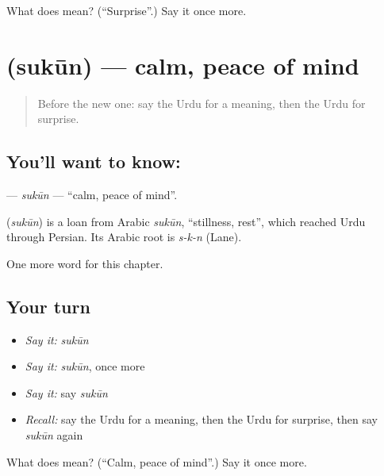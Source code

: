\begin{tcolorbox}[breakable,colback=teal!4,colframe=teal!35!black,title={Before you move on}]
What does  mean? (\textquotedblleft{}Surprise\textquotedblright{}.) Say it once more.
\end{tcolorbox}
\section[\texorpdfstring{\ur{سکون} (sukūn)}{سکون (sukūn)}]{ (sukūn) — calm, peace of mind}

\label{lesson:UR-C172-sukun}



\begin{quote}
Before the new one: say the Urdu for a meaning, then the Urdu for surprise.
\end{quote}

\subsection*{You'll want to know: }
\textbf{} — \emph{sukūn} — \textquotedblleft{}calm, peace of mind\textquotedblright{}.

\begin{cousinweb}
\textbf{} (\emph{sukūn}) is a loan from Arabic \emph{sukūn}, \textquotedblleft{}stillness, rest\textquotedblright{}, which reached Urdu through Persian. Its Arabic root is \emph{s-k-n} (Lane).
\end{cousinweb}

\begin{grammarlens}[title={What you've built}]
One more word for this chapter.
\end{grammarlens}

\subsection*{Your turn}
\begin{itemize}
\raggedright
  \item \emph{Say it:} \emph{sukūn}
  \item \emph{Say it:} \emph{sukūn}, once more
  \item \emph{Say it:} say \emph{sukūn}
  \item \emph{Recall:} say the Urdu for a meaning, then the Urdu for surprise, then say \emph{sukūn} again
\end{itemize}

\begin{tcolorbox}[breakable,colback=teal!4,colframe=teal!35!black,title={Before you move on}]
What does  mean? (\textquotedblleft{}Calm, peace of mind\textquotedblright{}.) Say it once more.
\end{tcolorbox}

